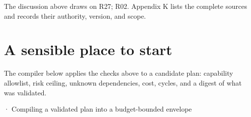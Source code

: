 The discussion above draws on R27; R02. Appendix K lists the complete sources and records their authority, version, and scope.\par

\section{A sensible place to start}

The compiler below applies the checks above to a candidate plan: capability allowlist, risk ceiling, unknown dependencies, cost, cycles, and a digest of what was validated.\par

\BookSnake · Compiling a validated plan into a budget-bounded envelope\par

\needspace{599.6pt}
